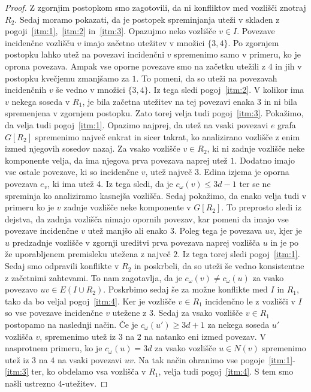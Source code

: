 \documentclass[12pt,a4paper,twoside]{article}
\theoremstyle{definition} %
\theoremstyle{plain} %
\numberwithin{equation}{section}  %
\begin{document}
\begin{proof}
Z zgornjim postopkom smo zagotovili, da ni konfliktov med vozlišči znotraj $R_2$. Sedaj moramo pokazati, da je postopek spreminjanja uteži v skladen z pogoji~\ref{itm:1},~\ref{itm:2} in~\ref{itm:3}. Opazujmo neko vozlišče $v \in I$. Povezave incidenčne vozlišču $v$ imajo začetno utežitev v množici $\{3,4\}$. Po zgornjem postopku lahko utež na povezavi incidenčni $v$ spremenimo samo v primeru, ko je oprona povezava. Ampak vse oporne povezave smo na začetku utežili z $4$ in jih v postopku kvečjemu zmanjšamo za $1$. To pomeni, da so uteži na povezavah incidenčnih $v$ še vedno v množici $\{3,4\}$. Iz tega sledi pogoj~\ref{itm:2}. V kolikor ima $v$ nekega soseda v $R_1$, je bila začetna utežitev na tej povezavi enaka $3$ in ni bila spremenjena v zgornjem postopku. Zato torej velja tudi pogoj~\ref{itm:3}. Pokažimo, da velja tudi pogoj~\ref{itm:1}. Opazimo najprej, da utež na vsaki povezavi $e$ grafa $G[R_2]$ spremenimo največ enkrat in sicer takrat, ko analizirano vozlišče z enim izmed njegovih sosedov nazaj. Za vsako vozlišče $v \in R_2$, ki ni zadnje vozlišče neke komponente velja, da ima njegova prva povezava naprej utež $1$. Dodatno imajo vse ostale povezave, ki so incidenčne $v$, utež največ $3$. Edina izjema je oporna povezava $e_v$, ki ima utež 4. Iz tega sledi, da je $c_{\omega}(v) \le 3d - 1$ ter se ne spreminja ko analiziramo kasnejša vozlišča. Sedaj pokažimo, da enako velja tudi v primeru ko je $v$ zadnje vozlišče neke komponente v $G[R_2]$. To preprosto sledi iz dejstva, da zadnja vozlišča nimajo opornih povezav, kar pomeni da imajo vse povezave incidenčne $v$ utež manjšo ali enako $3$. Poleg tega je povezava $uv$, kjer je $u$ predzadnje vozlišče v zgornji ureditvi prva povezava naprej vozlišča $u$ in je po že uporabljenem premisleku utežena z največ $2$. Iz tega torej sledi pogoj~\ref{itm:1}.
Sedaj smo odpravili konflikte v $R_2$ in poskrbeli, da so uteži še vedno konsistentne z začetnimi zahtevami. To nam zagotavlja, da je $c_{\omega}(v) \neq c_{\omega}(u)$ za vsako povezavo $uv \in E(I \cup R_2)$. Poskrbimo sedaj še za možne konflikte med $I$ in $R_1$, tako da bo veljal pogoj~\ref{itm:4}. Ker je vozlišče $v \in R_1$ incidenčno le z vozlišči v $I$ so vse povezave incidenčne $v$ utežene z $3$. Sedaj za vsako vozlišče $v \in R_1$ postopamo na naslednji način. Če je $c_{\omega}(u') \ge 3d + 1$ za nekega soseda $u'$ vozlišča $v$, spremenimo utež iz $3$ na $2$ na natanko eni izmed povezav. V nasprotnem primeru, ko je $c_{\omega}(u) = 3d$ za vsako vozlišče $u \in N(v)$ spremenimo utež  iz $3$ na $4$ na vsaki povezavi $uv$. Na tak način ohranimo vse pogoje~\ref{itm:1}-\ref{itm:3} ter, ko obdelamo vsa vozlišča v $R_1$, velja tudi pogoj~\ref{itm:4}. S tem smo našli ustrezno $4$-utežitev.
\end{proof}
\end{document}
